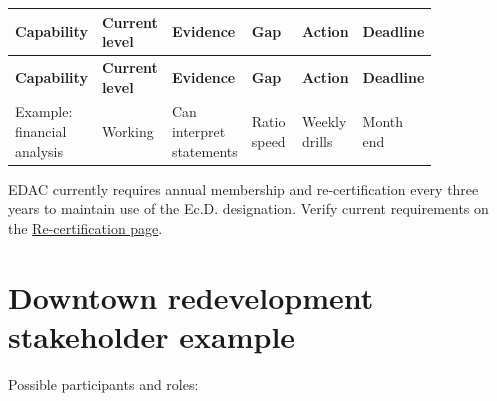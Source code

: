 \documentclass[11pt,letterpaper,oneside,openany]{book}
\begin{document}
\begin{center}
\small
\setlength{\LTpre}{0.4em}
\setlength{\LTpost}{0.8em}
\begin{longtable}{>{\RaggedRight\arraybackslash}p{0.140\linewidth}>{\RaggedRight\arraybackslash}p{0.140\linewidth}>{\RaggedRight\arraybackslash}p{0.140\linewidth}>{\RaggedRight\arraybackslash}p{0.140\linewidth}>{\RaggedRight\arraybackslash}p{0.140\linewidth}>{\RaggedRight\arraybackslash}p{0.140\linewidth}}
\rowcolor{DeepNavy}
\color{white}\bfseries Capability & \color{white}\bfseries Current level & \color{white}\bfseries Evidence & \color{white}\bfseries Gap & \color{white}\bfseries Action & \color{white}\bfseries Deadline \\
\endfirsthead
\rowcolor{DeepNavy}
\color{white}\bfseries Capability & \color{white}\bfseries Current level & \color{white}\bfseries Evidence & \color{white}\bfseries Gap & \color{white}\bfseries Action & \color{white}\bfseries Deadline \\
\endhead
Example: financial analysis & Working & Can interpret statements & Ratio speed & Weekly drills & Month end \\
\end{longtable}
\end{center}
EDAC currently requires annual membership and re-certification every three years to maintain use of the Ec.D. designation. Verify current requirements on the \href{https://edac.ca/professional-development/ec-d-recertification/}{Re-certification page}.


\section[Downtown redevelopment stakeholder example]{Downtown redevelopment stakeholder example}
Possible participants and roles:
\end{document}
